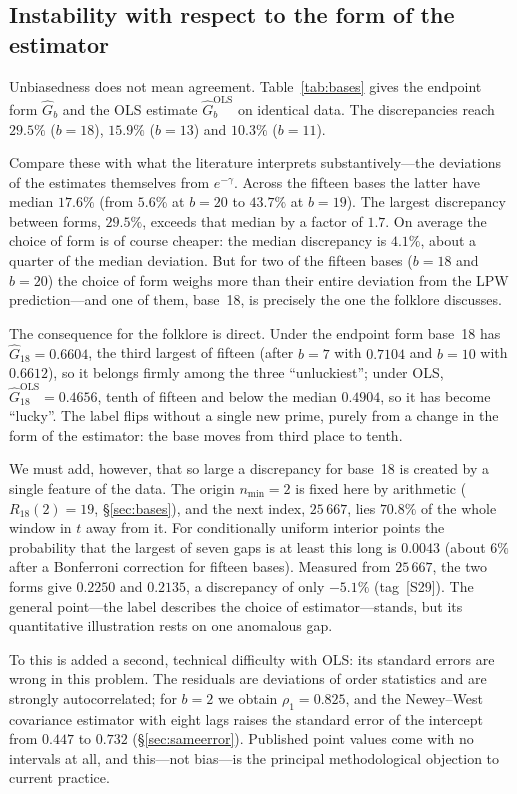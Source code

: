 \documentclass[11pt,a4paper]{article}
\theoremstyle{plain}
\theoremstyle{remark}
\newcommand{\emg}{e^{-\gamma}}
\begin{document}
\subsection{Instability with respect to the form of the estimator}\label{sec:instability}

Unbiasedness does not mean agreement. Table~\ref{tab:bases} gives the endpoint
form $\hat G_b$ and the OLS estimate $\hat G_b^{\mathrm{OLS}}$ on identical
data. The discrepancies reach $29.5\%$ ($b=18$), $15.9\%$ ($b=13$) and $10.3\%$
($b=11$).

Compare these with what the literature interprets substantively---the deviations
of the estimates themselves from $\emg$. Across the fifteen bases the latter
have median $17.6\%$ (from $5.6\%$ at $b=20$ to $43.7\%$ at $b=19$). The largest
discrepancy between forms, $29.5\%$, exceeds that median by a factor of $1.7$.
On average the choice of form is of course cheaper: the median discrepancy is
$4.1\%$, about a quarter of the median deviation. But for two of the fifteen
bases ($b=18$ and $b=20$) the choice of form weighs more than their entire
deviation from the LPW prediction---and one of them, base~18, is precisely the
one the folklore discusses.

The consequence for the folklore is direct. Under the endpoint form base~18 has
$\hat G_{18}=0.6604$, the third largest of fifteen (after $b=7$ with $0.7104$
and $b=10$ with $0.6612$), so it belongs firmly among the three ``unluckiest'';
under OLS, $\hat G_{18}^{\mathrm{OLS}}=0.4656$, tenth of fifteen and below the
median $0.4904$, so it has become ``lucky''. The label flips without a single
new prime, purely from a change in the form of the estimator: the base moves
from third place to tenth.

We must add, however, that so large a discrepancy for base~18 is created by a
single feature of the data. The origin $n_{\min}=2$ is fixed here by arithmetic
($R_{18}(2)=19$, \S\ref{sec:bases}), and the next index, $25\,667$, lies
$70.8\%$ of the whole window in $t$ away from it. For conditionally uniform
interior points the probability that the largest of seven gaps is at least this
long is $0.0043$ (about $6\%$ after a Bonferroni correction for fifteen bases).
Measured from $25\,667$, the two forms give $0.2250$ and $0.2135$, a discrepancy
of only $-5.1\%$ (tag~[S29]). The general point---the label describes the choice
of estimator---stands, but its quantitative illustration rests on one anomalous
gap.

To this is added a second, technical difficulty with OLS: its standard errors
are wrong in this problem. The residuals are deviations of order statistics and
are strongly autocorrelated; for $b=2$ we obtain $\rho_1=0.825$, and the
Newey--West covariance estimator with eight lags raises the standard error of
the intercept from $0.447$ to $0.732$ (\S\ref{sec:sameerror}). Published point
values come with no intervals at all, and this---not bias---is the principal
methodological objection to current practice.
\end{document}
